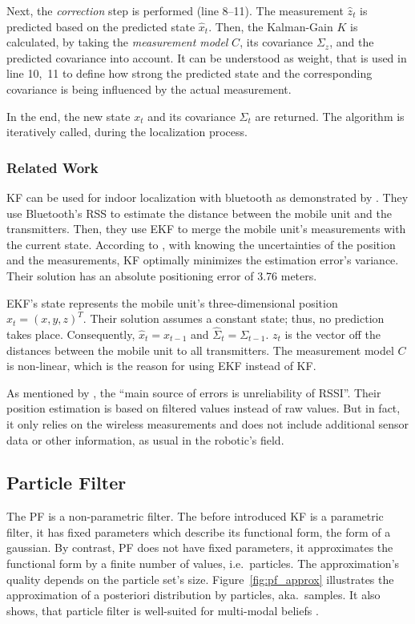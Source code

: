 Next, the \emph{correction} step is performed (line 8--11). The measurement $\hat{z}_t$ is predicted based on the predicted state $\hat{x}_t$. Then, the Kalman-Gain $K$ is calculated, by taking the \emph{measurement model} $C$, its covariance $\Sigma_z$, and the predicted covariance into account. It can be understood as weight, that is used in line 10,~11 to define how strong the predicted  state and the corresponding covariance is being influenced by the actual measurement.

In the end, the new state $x_t$ and its covariance $\Sigma_t$ are returned. The algorithm is iteratively called, during the localization process.

\subsubsection*{Related Work}
\acs{KF} can be used for indoor localization with bluetooth as demonstrated by \citet{kotanen:exp_local_pos_bt}. They use Bluetooth's \acs{RSS} to estimate the distance between the mobile unit and the transmitters. Then, they use \acl{EKF} to merge the mobile unit's measurements with the current state. According to \cite{kotanen:exp_local_pos_bt}, with knowing the uncertainties of the position and the measurements, \acs{KF} optimally minimizes the estimation error's variance. Their solution has an absolute positioning error of 3.76 meters.

\acs{EKF}'s state represents the mobile unit's three-dimensional position $x_t = (x, y, z)^T$. Their solution assumes a constant state; thus, no prediction takes place. Consequently, $\hat{x}_t = x_{t-1}$ and $\hat{\Sigma}_t = \Sigma_{t-1}$. $z_t$ is the vector off the distances between the mobile unit to all transmitters. The measurement model $C$ is non-linear, which is the reason for using \acs{EKF} instead of \acs{KF}.

As mentioned by \citet{kotanen:exp_local_pos_bt}, the ``main source of errors is unreliability of \acs{RSSI}''. Their position estimation is based on filtered values instead of raw values. But in fact, it only relies on the wireless measurements and does not include additional sensor data or other information, as usual in the robotic's field.

\subsection{Particle Filter}\label{sec:fund_pf}
The \ac{PF} is a non-parametric filter. The before introduced \acs{KF} is a parametric filter, it has fixed parameters which describe its functional form, the form of a gaussian. By contrast, \acs{PF} does not have fixed parameters, it approximates the functional form by a finite number of values, i.e.\ particles. The approximation's quality depends on the particle set's size. Figure~\ref{fig:pf_approx} illustrates the approximation of a posteriori distribution by particles, aka.\ samples. It also shows, that particle filter is well-suited for multi-modal beliefs \citep{thrun:prob_robo}.

